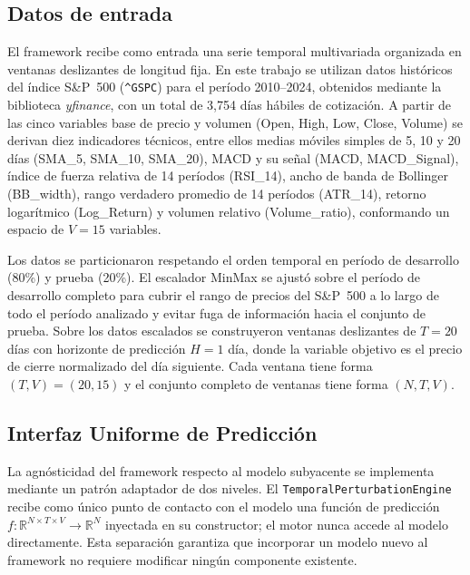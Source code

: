 \documentclass[conference, letterpaper]{IEEEtran}
\begin{document}
\subsection{Datos de entrada}
\label{sec:datos_entrada}

El framework recibe como entrada una serie temporal multivariada 
organizada en ventanas deslizantes de longitud fija. En este 
trabajo se utilizan datos históricos del índice S\&P~500 
(\texttt{\^{}GSPC}) para el período 2010--2024, obtenidos 
mediante la biblioteca \textit{yfinance}, con un total de 3{,}754 
días hábiles de cotización. A partir de las cinco variables base 
de precio y volumen (Open, High, Low, Close, Volume) se derivan
diez indicadores técnicos, entre ellos medias móviles simples de 5, 10 y 20
días (SMA\_5, SMA\_10, SMA\_20), MACD y su señal 
(MACD, MACD\_Signal), índice de fuerza relativa de 14 períodos 
(RSI\_14), ancho de banda de Bollinger (BB\_width), rango 
verdadero promedio de 14 períodos (ATR\_14), retorno logarítmico 
(Log\_Return) y volumen relativo (Volume\_ratio), conformando un 
espacio de $V=15$ variables.

Los datos se particionaron respetando el orden temporal en 
período de desarrollo (80\%) y prueba (20\%). El escalador MinMax
se ajustó sobre el período de desarrollo completo para cubrir el 
rango de precios del S\&P~500 a lo largo de todo el período 
analizado y evitar fuga de información hacia el conjunto de 
prueba. Sobre los datos escalados se construyeron ventanas 
deslizantes de $T=20$ días con horizonte de predicción $H=1$ día, 
donde la variable objetivo es el precio de cierre normalizado del 
día siguiente. Cada ventana tiene forma $(T, V) = (20, 15)$ y el 
conjunto completo de ventanas tiene forma $(N, T, V)$.

\subsection{Interfaz Uniforme de Predicción}

La agnósticidad del framework respecto al modelo subyacente se
implementa mediante un patrón adaptador de dos niveles. El
\texttt{TemporalPerturbationEngine} recibe como único punto de
contacto con el modelo una función de predicción $f:
\mathbb{R}^{N \times T \times V} \rightarrow \mathbb{R}^N$
inyectada en su constructor; el motor nunca accede al modelo
directamente. Esta separación garantiza que incorporar un modelo
nuevo al framework no requiere modificar ningún componente
existente.
\end{document}
